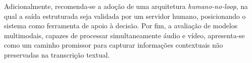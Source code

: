 Adicionalmente, recomenda-se a adoção de uma arquitetura \textit{humano-no-loop}, na qual a saída estruturada seja validada por um servidor humano, posicionando o sistema como ferramenta de apoio à decisão. Por fim, a avaliação de modelos multimodais, capazes de processar simultaneamente áudio e vídeo, apresenta-se como um caminho promissor para capturar informações contextuais não preservadas na transcrição textual.
